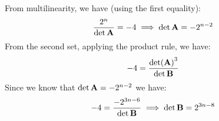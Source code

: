 \begin{sol}
    From multilinearity, we have (using the first equality):
    \begin{equation}
        \frac{2^n}{\det \mathbf{A}} = -4 \implies \det \mathbf{A} = -2^{n-2}
    \end{equation}
    From the second set, applying the product rule, we have:
    \begin{equation}
        -4 = \frac{\det(\mathbf{A})^3}{\det \mathbf{B}}
    \end{equation}
    Since we know that $\det \mathbf{A} = -2^{n-2}$ we have:
    \begin{equation}
        -4 = \frac{-2^{3n-6}}{\det \mathbf{B}} \implies \det \mathbf{B} = 2^{3n-8}
    \end{equation}
\end{sol}